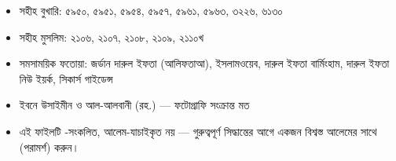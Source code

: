 \begin{itemize}
\item সহীহ বুখারি: ৫৯৫০, ৫৯৫১, ৫৯৫৪, ৫৯৫৭, ৫৯৬১, ৫৯৬৩, ৩২২৬, ৬১৩০
\item সহীহ মুসলিম: ২১০৬, ২১০৭, ২১০৮, ২১০৯, ২১১০খ
\item সমসাময়িক ফতোয়া: জর্ডান দারুল ইফতা (আলিফতাআ), ইসলামওয়েব, দারুল ইফতা বার্মিংহাম, দারুল ইফতা নিউ ইয়র্ক, সিকার্স গাইডেন্স
\item ইবনে উসাইমীন ও আল-আলবানী (রহ.) — ফটোগ্রাফি সংক্রান্ত মত
\item এই ফাইলটি -সংকলিত, আলেম-যাচাইকৃত নয় — গুরুত্বপূর্ণ সিদ্ধান্তের আগে একজন বিশ্বস্ত আলেমের সাথে  (পরামর্শ) করুন।
\end{itemize}


